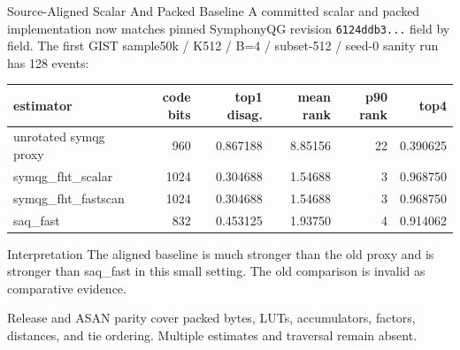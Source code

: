\documentclass[aspectratio=169,10pt]{beamer}
\begin{document}
\begin{frame}[fragile]{Source-Aligned Scalar And Packed Baseline}
\scriptsize
A committed scalar and packed implementation now matches pinned SymphonyQG
revision \texttt{6124ddb3...} field by field. The first GIST sample50k / K512 /
B=4 / subset-512 / seed-0 sanity run has 128 events:

\begin{tabular}{lrrrrr}
\toprule
estimator & code bits & top1 disag. & mean rank & p90 rank & top4 \\
\midrule
unrotated symqg proxy & 960 & 0.867188 & 8.85156 & 22 & 0.390625 \\
symqg\_fht\_scalar & 1024 & 0.304688 & 1.54688 & 3 & 0.968750 \\
symqg\_fht\_fastscan & 1024 & 0.304688 & 1.54688 & 3 & 0.968750 \\
saq\_fast & 832 & 0.453125 & 1.93750 & 4 & 0.914062 \\
\bottomrule
\end{tabular}

\vspace{0.8em}
\begin{alertblock}{Interpretation}
The aligned baseline is much stronger than the old proxy and is stronger
than saq\_fast in this small setting. The old comparison is invalid as
comparative evidence.
\end{alertblock}

Release and ASAN parity cover packed bytes, LUTs, accumulators, factors,
distances, and tie ordering. Multiple estimates and traversal remain absent.
\end{frame}
\end{document}
